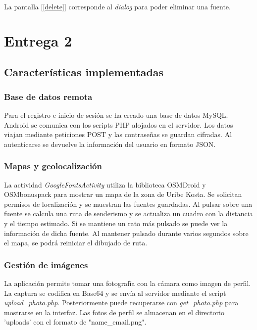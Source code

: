 \documentclass[11pt,a4paper]{article}
\begin{document}
    La pantalla [\ref{delete}] corresponde al \textit{dialog} para poder eliminar una fuente.\\


\newpage



\newpage
\section{Entrega 2}
\subsection{Características implementadas}
\subsubsection{Base de datos remota}
Para el registro e inicio de sesión se ha creado una base de datos MySQL. Android se comunica con los scripts PHP alojados en el servidor. Los datos viajan mediante peticiones POST y las contraseñas se guardan cifradas. Al autenticarse se devuelve la información del usuario en formato JSON.

\subsubsection{Mapas y geolocalización}
La actividad \textit{GoogleFontsActivity} utiliza la biblioteca OSMDroid y OSMbonuspack para mostrar un mapa de la zona de Uribe Kosta. Se solicitan permisos de localización y se muestran las fuentes guardadas. Al pulsar sobre una fuente se calcula una ruta de senderismo y se actualiza un cuadro con la distancia y el tiempo estimado. Si se mantiene un rato más pulsado se puede ver la información de dicha fuente. Al mantener pulsado durante varios segundos sobre el mapa, se podrá reiniciar el dibujado de ruta.

\subsubsection{Gestión de imágenes}
La aplicación permite tomar una fotografía con la cámara como imagen de perfil. La captura se codifica en Base64 y se envía al servidor mediante el script \textit{upload\_photo.php}. Posteriormente puede recuperarse con \textit{get\_photo.php} para mostrarse en la interfaz. Las fotos de perfil se almacenan en el directorio 'uploads' con el formato de "name\_email.png".
\end{document}
